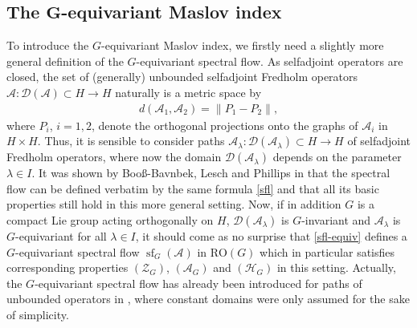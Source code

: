\documentclass[pdftex]{sigma}
\numberwithin{equation}{section}
\theoremstyle{definition}
\DeclareMathOperator{\sfl}{sf}
\begin{document}
\subsection{The \texorpdfstring{$\boldsymbol{G}$}{G}-equivariant Maslov index}
To introduce the $G$-equivariant Maslov index, we firstly need a slightly more general definition of the $G$-equivariant spectral flow. As selfadjoint operators are closed, the set of (generally) unbounded selfadjoint Fredholm operators $\mathcal{A}\colon \mathcal{D}(\mathcal{A})\subset H\rightarrow H$ naturally is a metric space by
\begin{align}\label{gap}
d(\mathcal{A}_1,\mathcal{A}_2)=\|P_1-P_2\|,
\end{align}
where $P_i$, $i=1,2$, denote the orthogonal projections onto the graphs of $\mathcal{A}_i$ in $H\times H$. Thus, it is sensible to consider paths $\mathcal{A}_\lambda \colon \mathcal{D}(\mathcal{A}_\lambda)\subset H\rightarrow H$ of selfadjoint Fredholm operators, where now the domain $\mathcal{D}(\mathcal{A}_\lambda)$ depends on the parameter $\lambda\in I$. It was shown by Boo{\ss}-Bavnbek, Lesch and Phillips in \cite{UnbSpecFlow} that the spectral flow can be defined verbatim by the same formula \eqref{sfl} and that all its basic properties still hold in this more general setting. Now, if in addition $G$ is a compact Lie group acting orthogonally on $H$, $\mathcal{D}(\mathcal{A}_\lambda)$ is $G$-invariant and $\mathcal{A}_\lambda$ is $G$-equivariant for all $\lambda\in I$, it should come as no surprise that \eqref{sfl-equiv} defines a $G$-equivariant spectral flow $\sfl_G(\mathcal{A})$ in $\mathrm{RO}(G)$ which in particular satisfies corresponding properties $(\mathcal{Z}_G)$, $(\mathcal{A}_G)$ and $(\mathcal{H}_G)$ in this setting. Actually, the $G$-equivariant spectral flow has already been introduced for paths of unbounded operators in \cite{MJN21}, where constant domains were only assumed for the sake of simplicity.
\end{document}
